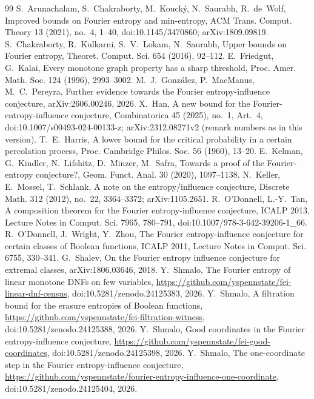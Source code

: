 \documentclass[11pt]{amsart}
\theoremstyle{remark}
\begin{document}
\begin{thebibliography}{99}
 S.~Arunachalam, S.~Chakraborty, M.~Kouck\'y, N.~Saurabh, R.~de~Wolf, Improved bounds on Fourier
entropy and min-entropy, ACM Trans. Comput. Theory 13 (2021), no.~4, 1--40, doi:10.1145/3470860; arXiv:1809.09819.
 S.~Chakraborty, R.~Kulkarni, S.~V.~Lokam, N.~Saurabh, Upper bounds on Fourier entropy, Theoret.
Comput. Sci. 654 (2016), 92--112.
 E.~Friedgut, G.~Kalai, Every monotone graph property has a sharp threshold, Proc. Amer. Math. Soc.
124 (1996), 2993--3002.
 M.~J.~Gonz\'alez, P.~MacManus, M.~C.~Pereyra, Further evidence towards the Fourier
entropy-influence conjecture, arXiv:2606.00246, 2026.
 X.~Han, A new bound for the Fourier-entropy-influence conjecture, Combinatorica 45 (2025), no.~1,
Art.~4, doi:10.1007/s00493-024-00133-z; arXiv:2312.08271v2 (remark numbers as in this version).
 T.~E.~Harris, A lower bound for the critical probability in a certain percolation process, Proc.
Cambridge Philos. Soc. 56 (1960), 13--20.
 E.~Kelman, G.~Kindler, N.~Lifshitz, D.~Minzer, M.~Safra, Towards a proof of the
Fourier-entropy conjecture?, Geom. Funct. Anal. 30 (2020), 1097--1138.
 N.~Keller, E.~Mossel, T.~Schlank, A note on the entropy/influence conjecture, Discrete Math. 312
(2012), no.~22, 3364--3372; arXiv:1105.2651.
 R.~O'Donnell, L.-Y.~Tan, A composition theorem for the Fourier entropy-influence conjecture, ICALP 2013,
Lecture Notes in Comput. Sci. 7965, 780--791, doi:10.1007/978-3-642-39206-1\_66.
 R.~O'Donnell, J.~Wright, Y.~Zhou, The Fourier entropy-influence conjecture for certain classes of
Boolean functions, ICALP 2011, Lecture Notes in Comput. Sci. 6755, 330--341.
 G.~Shalev, On the Fourier entropy influence conjecture for extremal classes, arXiv:1806.03646, 2018.
 Y.~Shmalo, The Fourier entropy of linear monotone DNFs on few variables,
\url{https://github.com/yspennstate/fei-linear-dnf-census}, doi:10.5281/zenodo.24125383, 2026.
 Y.~Shmalo, A filtration bound for the erasure entropies of Boolean functions,
\url{https://github.com/yspennstate/fei-filtration-witness}, doi:10.5281/zenodo.24125388, 2026.
 Y.~Shmalo, Good coordinates in the Fourier entropy-influence conjecture,
\url{https://github.com/yspennstate/fei-good-coordinates}, doi:10.5281/zenodo.24125398, 2026.
 Y.~Shmalo, The one-coordinate step in the Fourier entropy-influence conjecture,
\url{https://github.com/yspennstate/fourier-entropy-influence-one-coordinate}, doi:10.5281/zenodo.24125404, 2026.

\end{thebibliography}
\end{document}

